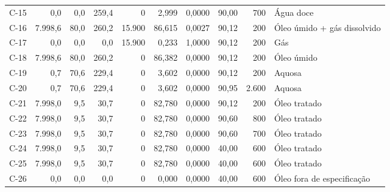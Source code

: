\documentclass[11pt,a4paper]{article}
\numberwithin{equation}{section}
\numberwithin{table}{section}
\numberwithin{figure}{section}
\begin{document}
{\begin{longtable}{lrrrrrrrrL{2.5cm}}
C-15 & 0,0 & 0,0 & 259,4 & 0 & 2,999 & 0,0000 & 90,00 & 700 & {\scriptsize Água doce}\\
C-16 & 7.998,6 & 80,0 & 260,2 & 15.900 & 86,615 & 0,0027 & 90,12 & 200 & {\scriptsize Óleo úmido + gás dissolvido}\\
C-17 & 0,0 & 0,0 & 0,0 & 15.900 & 0,233 & 1,0000 & 90,12 & 200 & {\scriptsize Gás}\\
C-18 & 7.998,6 & 80,0 & 260,2 & 0 & 86,382 & 0,0000 & 90,12 & 200 & {\scriptsize Óleo úmido}\\
C-19 & 0,7 & 70,6 & 229,4 & 0 & 3,602 & 0,0000 & 90,12 & 200 & {\scriptsize Aquosa}\\
C-20 & 0,7 & 70,6 & 229,4 & 0 & 3,602 & 0,0000 & 90,95 & 2.600 & {\scriptsize Aquosa}\\
C-21 & 7.998,0 & 9,5 & 30,7 & 0 & 82,780 & 0,0000 & 90,12 & 200 & {\scriptsize Óleo tratado}\\
C-22 & 7.998,0 & 9,5 & 30,7 & 0 & 82,780 & 0,0000 & 90,60 & 800 & {\scriptsize Óleo tratado}\\
C-23 & 7.998,0 & 9,5 & 30,7 & 0 & 82,780 & 0,0000 & 90,60 & 700 & {\scriptsize Óleo tratado}\\
C-24 & 7.998,0 & 9,5 & 30,7 & 0 & 82,780 & 0,0000 & 40,00 & 600 & {\scriptsize Óleo tratado}\\
C-25 & 7.998,0 & 9,5 & 30,7 & 0 & 82,780 & 0,0000 & 40,00 & 600 & {\scriptsize Óleo tratado}\\
C-26 & 0,0 & 0,0 & 0,0 & 0 & 0,000 & 0,0000 & 40,00 & 600 & {\scriptsize Óleo fora de especificação}\\
\bottomrule\end{longtable}}
\end{document}
